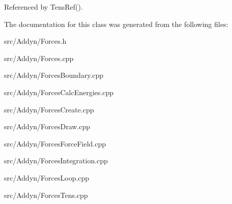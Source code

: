 Referenced by Tens\+Ref().



The documentation for this class was generated from the following files\+:\begin{DoxyCompactItemize}
\item 
src/\+Addyn/Forces.\+h\item 
src/\+Addyn/Forces.\+cpp\item 
src/\+Addyn/Forces\+Boundary.\+cpp\item 
src/\+Addyn/Forces\+Calc\+Energies.\+cpp\item 
src/\+Addyn/Forces\+Create.\+cpp\item 
src/\+Addyn/Forces\+Draw.\+cpp\item 
src/\+Addyn/Forces\+Force\+Field.\+cpp\item 
src/\+Addyn/Forces\+Integration.\+cpp\item 
src/\+Addyn/Forces\+Loop.\+cpp\item 
src/\+Addyn/Forces\+Tens.\+cpp\end{DoxyCompactItemize}

